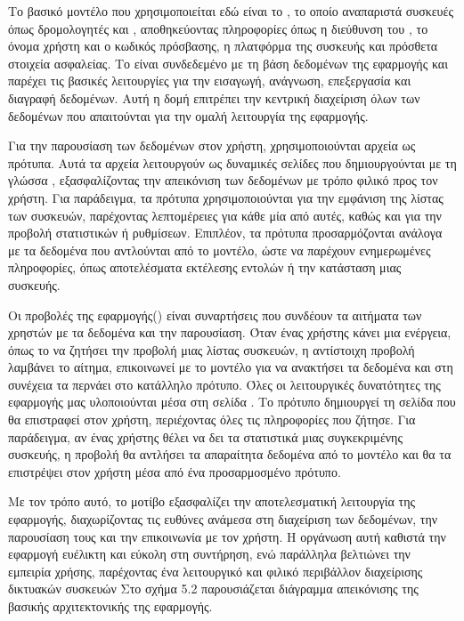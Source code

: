Το βασικό μοντέλο που χρησιμοποιείται εδώ είναι το , 
το οποίο αναπαριστά συσκευές όπως δρομολογητές και , 
αποθηκεύοντας πληροφορίες όπως η διεύθυνση του , το όνομα 
χρήστη και ο κωδικός πρόσβασης, η πλατφόρμα της συσκευής 
και πρόσθετα στοιχεία ασφαλείας. Το  είναι συνδεδεμένο με 
τη βάση δεδομένων της εφαρμογής και παρέχει τις βασικές λειτουργίες 
για την εισαγωγή, ανάγνωση, επεξεργασία και διαγραφή δεδομένων. 
Αυτή η δομή επιτρέπει την κεντρική διαχείριση όλων των δεδομένων που 
απαιτούνται για την ομαλή λειτουργία της εφαρμογής.

Για την παρουσίαση των δεδομένων στον χρήστη, χρησιμοποιούνται αρχεία 
 ως πρότυπα. Αυτά τα αρχεία λειτουργούν ως δυναμικές σελίδες 
που δημιουργούνται με τη γλώσσα , εξασφαλίζοντας 
την απεικόνιση των δεδομένων με τρόπο φιλικό προς τον χρήστη. 
Για παράδειγμα, τα πρότυπα χρησιμοποιούνται για την εμφάνιση της λίστας των συσκευών, παρέχοντας λεπτομέρειες για κάθε μία από αυτές, καθώς και για την προβολή στατιστικών ή ρυθμίσεων. Επιπλέον, τα πρότυπα προσαρμόζονται ανάλογα με τα δεδομένα που αντλούνται από το μοντέλο, ώστε να παρέχουν ενημερωμένες πληροφορίες, όπως αποτελέσματα εκτέλεσης εντολών ή την κατάσταση μιας συσκευής.

Οι προβολές της εφαρμογής() είναι συναρτήσεις  που συνδέουν 
τα αιτήματα των χρηστών με τα δεδομένα και την παρουσίαση. 
Όταν ένας χρήστης κάνει μια ενέργεια, όπως το να ζητήσει την προβολή 
μιας λίστας συσκευών, η αντίστοιχη προβολή λαμβάνει το αίτημα, 
επικοινωνεί με το μοντέλο για να ανακτήσει τα δεδομένα και στη 
συνέχεια τα περνάει στο κατάλληλο πρότυπο. Όλες οι λειτουργικές δυνατότητες της εφαρμογής μας υλοποιούνται μέσα στη σελίδα .
Το πρότυπο δημιουργεί τη σελίδα  που θα επιστραφεί στον χρήστη, περιέχοντας όλες τις πληροφορίες που ζήτησε. Για παράδειγμα, αν ένας χρήστης θέλει να δει τα στατιστικά μιας συγκεκριμένης συσκευής, η προβολή θα αντλήσει τα απαραίτητα δεδομένα από το μοντέλο και θα τα επιστρέψει στον χρήστη μέσα από ένα προσαρμοσμένο πρότυπο.

Με τον τρόπο αυτό, το μοτίβο  εξασφαλίζει την αποτελεσματική 
λειτουργία της εφαρμογής, διαχωρίζοντας τις ευθύνες ανάμεσα στη 
διαχείριση των δεδομένων, την παρουσίαση τους και την επικοινωνία με τον χρήστη. Η οργάνωση αυτή καθιστά την εφαρμογή ευέλικτη και εύκολη στη συντήρηση, ενώ παράλληλα βελτιώνει την εμπειρία χρήσης, παρέχοντας ένα λειτουργικό και φιλικό περιβάλλον διαχείρισης δικτυακών συσκευών
Στο σχήμα 5.2 παρουσιάζεται διάγραμμα απεικόνισης της βασικής αρχιτεκτονικής της εφαρμογής.

